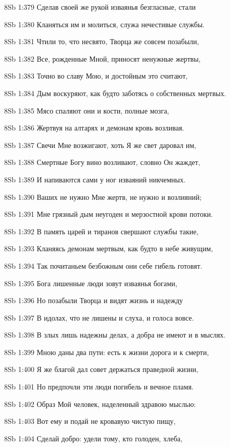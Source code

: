 \vs 8Sb 1:379 Сделав своей же рукой изваянья безгласные, стали

\vs 8Sb 1:380 Кланяться им и молиться, служа нечестивые службы. 

\vs 8Sb 1:381 Чтили то, что несвято, Творца же совсем позабыли, 

\vs 8Sb 1:382 Все, рожденные Мной, приносят ненужные жертвы, 

\vs 8Sb 1:383 Точно во славу Мою, и достойным это считают, 

\vs 8Sb 1:384 Дым воскуряют, как будто заботясь о собственных мертвых.

\vs 8Sb 1:385 Мясо спаляют они и кости, полные мозга, 

\vs 8Sb 1:386 Жертвуя на алтарях и демонам кровь возливая. 

\vs 8Sb 1:387 Свечи Мне возжигают, хоть Я же свет даровал им, 

\vs 8Sb 1:388 Смертные Богу вино возливают, словно Он жаждет, 

\vs 8Sb 1:389 И напиваются сами у ног изваяний никчемных.

\vs 8Sb 1:390 Ваших не нужно Мне жертв, не нужно и возлияний; 

\vs 8Sb 1:391 Мне грязный дым неугоден и мерзостной крови потоки. 

\vs 8Sb 1:392 В память царей и тиранов свершают службы такие, 

\vs 8Sb 1:393 Кланяясь демонам мертвым, как будто в небе живущим,  

\vs 8Sb 1:394 Так почитаньем безбожным они себе гибель готовят.

\vs 8Sb 1:395 Бога лишенные люди зовут изваянья богами, 

\vs 8Sb 1:396 Но позабыли Творца и видят жизнь и надежду 

\vs 8Sb 1:397 В идолах, что не лишены и слуха, и голоса вовсе. 

\vs 8Sb 1:398 В злых лишь надежны делах, а добра не имеют и в мыслях.

\vs 8Sb 1:399 Мною даны два пути: есть к жизни дорога и к смерти,

\vs 8Sb 1:400 Я же благой дал совет  держаться праведной жизни, 

\vs 8Sb 1:401 Но предпочли эти люди погибель и вечное пламя. 

\vs 8Sb 1:402 Образ Мой  человек, наделенный здравою мыслью: 

\vs 8Sb 1:403 Вот ему и подай не кровавую  чистую пищу, 

\vs 8Sb 1:404 Сделай добро: удели тому, кто голоден, хлеба,

